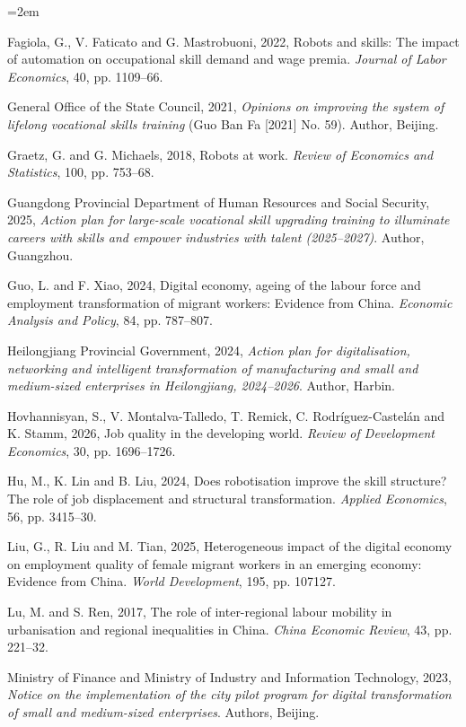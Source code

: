\documentclass[12pt]{article}
\begin{document}
\begin{list}{}{\leftmargin=2em}
\item Fagiola, G., V. Faticato and G. Mastrobuoni, 2022, Robots and skills: The impact of automation on occupational skill demand and wage premia. \emph{Journal of Labor Economics}, 40, pp. 1109--66.
\item General Office of the State Council, 2021, \emph{Opinions on improving the system of lifelong vocational skills training} (Guo Ban Fa [2021] No. 59). Author, Beijing.
\item Graetz, G. and G. Michaels, 2018, Robots at work. \emph{Review of Economics and Statistics}, 100, pp. 753--68.
\item Guangdong Provincial Department of Human Resources and Social Security, 2025, \emph{Action plan for large-scale vocational skill upgrading training to illuminate careers with skills and empower industries with talent (2025--2027)}. Author, Guangzhou.
\item Guo, L. and F. Xiao, 2024, Digital economy, ageing of the labour force and employment transformation of migrant workers: Evidence from China. \emph{Economic Analysis and Policy}, 84, pp. 787--807.
\item Heilongjiang Provincial Government, 2024, \emph{Action plan for digitalisation, networking and intelligent transformation of manufacturing and small and medium-sized enterprises in Heilongjiang, 2024--2026}. Author, Harbin.
\item Hovhannisyan, S., V. Montalva-Talledo, T. Remick, C. Rodr\'iguez-Castel\'an and K. Stamm, 2026, Job quality in the developing world. \emph{Review of Development Economics}, 30, pp. 1696--1726.
\item Hu, M., K. Lin and B. Liu, 2024, Does robotisation improve the skill structure? The role of job displacement and structural transformation. \emph{Applied Economics}, 56, pp. 3415--30.
\item Liu, G., R. Liu and M. Tian, 2025, Heterogeneous impact of the digital economy on employment quality of female migrant workers in an emerging economy: Evidence from China. \emph{World Development}, 195, pp. 107127.
\item Lu, M. and S. Ren, 2017, The role of inter-regional labour mobility in urbanisation and regional inequalities in China. \emph{China Economic Review}, 43, pp. 221--32.
\item Ministry of Finance and Ministry of Industry and Information Technology, 2023, \emph{Notice on the implementation of the city pilot program for digital transformation of small and medium-sized enterprises}. Authors, Beijing.

\end{list}
\end{document}
